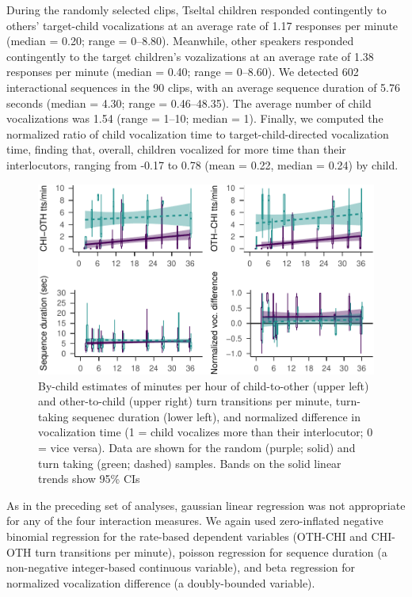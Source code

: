 \documentclass[floatsintext,man]{apa6}
\theoremstyle{definition}
\theoremstyle{definition}
\theoremstyle{definition}
\theoremstyle{remark}
\begin{document}
During the randomly selected clips, Tseltal children responded
contingently to others' target-child vocalizations at an average rate of
1.17 responses per minute (median = 0.20; range = 0--8.80). Meanwhile,
other speakers responded contingently to the target children's
vozalizations at an average rate of 1.38 responses per minute (median =
0.40; range = 0--8.60). We detected 602 interactional sequences in the
90 clips, with an average sequence duration of 5.76 seconds (median =
4.30; range = 0.46--48.35). The average number of child vocalizations
was 1.54 (range = 1--10; median = 1). Finally, we computed the
normalized ratio of child vocalization time to target-child-directed
vocalization time, finding that, overall, children vocalized for more
time than their interlocutors, ranging from -0.17 to 0.78 (mean = 0.22,
median = 0.24) by child.

\begin{figure}
\centering
\includegraphics{Tseltal-CLE_files/figure-latex/fig2-1.pdf}
\caption{\label{fig:fig2}By-child estimates of minutes per hour of
child-to-other (upper left) and other-to-child (upper right) turn
transitions per minute, turn-taking sequenec duration (lower left), and
normalized difference in vocalization time (1 = child vocalizes more
than their interlocutor; 0 = vice versa). Data are shown for the random
(purple; solid) and turn taking (green; dashed) samples. Bands on the
solid linear trends show 95\% CIs}
\end{figure}

As in the preceding set of analyses, gaussian linear regression was not
appropriate for any of the four interaction measures. We again used
zero-inflated negative binomial regression for the rate-based dependent
variables (OTH-CHI and CHI-OTH turn transitions per minute), poisson
regression for sequence duration (a non-negative integer-based
continuous variable), and beta regression for normalized vocalization
difference (a doubly-bounded variable).
\end{document}
